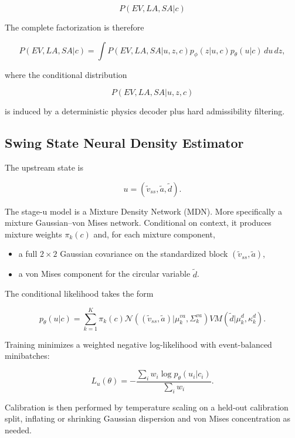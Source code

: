\documentclass[11pt]{article}
\begin{document}
\[
P(EV, LA, SA | c)
\]

The complete factorization is therefore

\begin{equation}
P(EV, LA, SA | c)
=
\int
P(EV, LA, SA | u, z, c)
p_\phi(z | u, c)
p_\theta(u | c)
\,du\,dz,
\end{equation}

where the conditional distribution

\[
P(EV, LA, SA | u, z, c)
\]

is induced by a deterministic physics decoder plus hard admissibility filtering.




\subsection{Swing State Neural Density Estimator}

The upstream state is

\[
u = (\tilde{v}_{ss}, \tilde{a}, \tilde{d}).
\]


The stage-u model is a Mixture Density Network (MDN). More specifically a mixture Gaussian–von Mises network. Conditional on context, it produces mixture weights \(\pi_k(c)\) and, for each mixture component,

\begin{itemize}
    \item a full \(2 \times 2\) Gaussian covariance on the standardized block \((\tilde{v}_{ss}, \tilde{a})\),
    \item a von Mises component for the circular variable \(\tilde{d}\).
\end{itemize}

The conditional likelihood takes the form

\begin{equation}
p_\theta(u | c)
=
\sum_{k=1}^{K}
\pi_k(c)
\mathcal{N}
\left(
(\tilde{v}_{ss}, \tilde{a}) | \mu_k^{va}, \Sigma_k^{va}
\right)
VM(\tilde{d} | \mu_k^d, \kappa_k^d).
\end{equation}


Training minimizes a weighted negative log-likelihood with event-balanced minibatches:

\begin{equation}
L_u(\theta)
=
-
\frac{
\sum_i w_i \log p_\theta(u_i | c_i)
}{
\sum_i w_i
}.
\end{equation}

Calibration is then performed by temperature scaling on a held-out calibration split, inflating or shrinking Gaussian dispersion and von Mises concentration as needed.
\end{document}
